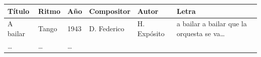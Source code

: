 \documentclass[]{article}
\begin{document}
\begin{longtable}[]{@{}llllll@{}}
\toprule
\begin{minipage}[b]{0.09\columnwidth}\raggedright\strut
Título\strut
\end{minipage} & \begin{minipage}[b]{0.07\columnwidth}\raggedright\strut
Ritmo\strut
\end{minipage} & \begin{minipage}[b]{0.06\columnwidth}\raggedright\strut
Año\strut
\end{minipage} & \begin{minipage}[b]{0.11\columnwidth}\raggedright\strut
Compositor\strut
\end{minipage} & \begin{minipage}[b]{0.11\columnwidth}\raggedright\strut
Autor\strut
\end{minipage} & \begin{minipage}[b]{0.38\columnwidth}\raggedright\strut
Letra\strut
\end{minipage}\tabularnewline
\midrule
\endhead
\begin{minipage}[t]{0.09\columnwidth}\raggedright\strut
A bailar\strut
\end{minipage} & \begin{minipage}[t]{0.07\columnwidth}\raggedright\strut
Tango\strut
\end{minipage} & \begin{minipage}[t]{0.06\columnwidth}\raggedright\strut
1943\strut
\end{minipage} & \begin{minipage}[t]{0.11\columnwidth}\raggedright\strut
D. Federico\strut
\end{minipage} & \begin{minipage}[t]{0.11\columnwidth}\raggedright\strut
H. Expósito\strut
\end{minipage} & \begin{minipage}[t]{0.38\columnwidth}\raggedright\strut
a bailar a bailar que la orquesta se va\ldots{}\strut
\end{minipage}\tabularnewline
\begin{minipage}[t]{0.09\columnwidth}\raggedright\strut
\ldots{}\strut
\end{minipage} & \begin{minipage}[t]{0.07\columnwidth}\raggedright\strut
\ldots{}\strut
\end{minipage} & \begin{minipage}[t]{0.06\columnwidth}\raggedright\strut
\ldots{}\strut

\end{minipage}
\end{longtable}
\end{document}
